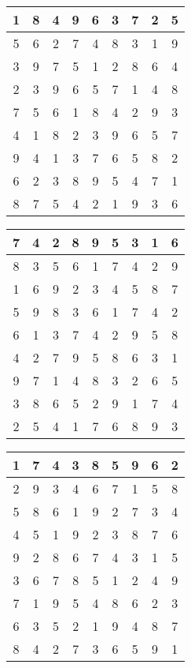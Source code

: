 \documentclass[]{article}
\begin{document}
\setlength\tabcolsep{8pt}

\bgroup
\def\arraystretch{2}
\begin{tabular}{c|c|c|c|c|c|c|c|c}
1 & 8 & 4 & 9 & 6 & 3 & 7 & 2 & 5 \\\hline
5 & 6 & 2 & 7 & 4 & 8 & 3 & 1 & 9 \\\hline
3 & 9 & 7 & 5 & 1 & 2 & 8 & 6 & 4 \\\hline
2 & 3 & 9 & 6 & 5 & 7 & 1 & 4 & 8 \\\hline
7 & 5 & 6 & 1 & 8 & 4 & 2 & 9 & 3 \\\hline
4 & 1 & 8 & 2 & 3 & 9 & 6 & 5 & 7 \\\hline
9 & 4 & 1 & 3 & 7 & 6 & 5 & 8 & 2 \\\hline
6 & 2 & 3 & 8 & 9 & 5 & 4 & 7 & 1 \\\hline
8 & 7 & 5 & 4 & 2 & 1 & 9 & 3 & 6 
\end{tabular}
\egroup

\vspace{1cm}

\bgroup
\def\arraystretch{2}
\begin{tabular}{c|c|c|c|c|c|c|c|c}
7 & 4 & 2 & 8 & 9 & 5 & 3 & 1 & 6 \\\hline
8 & 3 & 5 & 6 & 1 & 7 & 4 & 2 & 9 \\\hline
1 & 6 & 9 & 2 & 3 & 4 & 5 & 8 & 7 \\\hline
5 & 9 & 8 & 3 & 6 & 1 & 7 & 4 & 2 \\\hline
6 & 1 & 3 & 7 & 4 & 2 & 9 & 5 & 8 \\\hline
4 & 2 & 7 & 9 & 5 & 8 & 6 & 3 & 1 \\\hline
9 & 7 & 1 & 4 & 8 & 3 & 2 & 6 & 5 \\\hline
3 & 8 & 6 & 5 & 2 & 9 & 1 & 7 & 4 \\\hline
2 & 5 & 4 & 1 & 7 & 6 & 8 & 9 & 3 
\end{tabular}
\egroup

\vspace{1cm}

\bgroup
\def\arraystretch{2}
\begin{tabular}{c|c|c|c|c|c|c|c|c}
1 & 7 & 4 & 3 & 8 & 5 & 9 & 6 & 2 \\\hline
2 & 9 & 3 & 4 & 6 & 7 & 1 & 5 & 8 \\\hline
5 & 8 & 6 & 1 & 9 & 2 & 7 & 3 & 4 \\\hline
4 & 5 & 1 & 9 & 2 & 3 & 8 & 7 & 6 \\\hline
9 & 2 & 8 & 6 & 7 & 4 & 3 & 1 & 5 \\\hline
3 & 6 & 7 & 8 & 5 & 1 & 2 & 4 & 9 \\\hline
7 & 1 & 9 & 5 & 4 & 8 & 6 & 2 & 3 \\\hline
6 & 3 & 5 & 2 & 1 & 9 & 4 & 8 & 7 \\\hline
8 & 4 & 2 & 7 & 3 & 6 & 5 & 9 & 1 
\end{tabular}
\egroup
\end{document}
